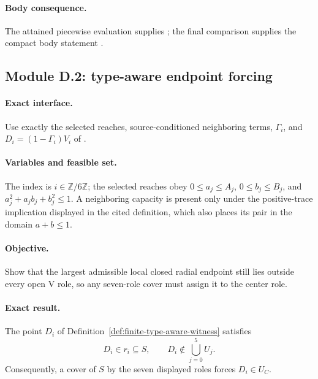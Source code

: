 \paragraph{Body consequence.}
The attained piecewise evaluation supplies
; the final comparison supplies the
compact body statement .

\subsection{Module D.2: type-aware endpoint forcing}

\paragraph{Exact interface.}
Use exactly the selected reaches, source-conditioned neighboring terms,
$\Gamma_i$, and $D_i=(1-\Gamma_i)V_i$ of
.

\paragraph{Variables and feasible set.}
The index is $i\in\mathbb Z/6\mathbb Z$; the selected reaches obey
$0\le a_j\le A_j$, $0\le b_j\le B_j$, and
$a_j^2+a_jb_j+b_j^2\le1$.  A neighboring capacity is present only under the
positive-trace implication displayed in the cited definition, which also
places its pair in the domain $a+b\le1$.

\paragraph{Objective.}
Show that the largest admissible local closed radial endpoint still lies
outside every open V role, so any seven-role cover must assign it to the
center role.

\paragraph{Exact result.}

\begin{lemma}
\label{lem:app-type-aware-radial-forcing}
The point $D_i$ of Definition~\ref{def:finite-type-aware-witness} satisfies
\[
 D_i\in r_i\subseteq S,
 \qquad D_i\notin\bigcup_{j=0}^5U_j.
\]
Consequently, a cover of $S$ by the seven displayed roles forces
$D_i\in U_C$.
\end{lemma}

